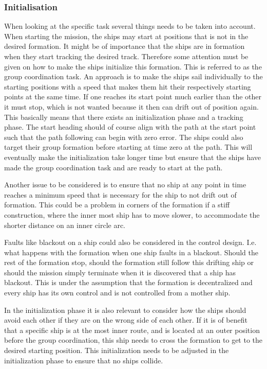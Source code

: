 \subsubsection{Initialisation}
When looking at the specific task several things needs to be taken into account. When starting the mission, the ships may start at positions that is not in the desired formation. It might be of importance that the ships are in
formation when they start tracking the desired track. Therefore some
attention must be given on how to make the ships initialize this
formation. This is referred to as the group coordination task. An approach is to make the ships sail individually to the
starting positions with a speed that makes them hit their respectively starting points at
the same time. If one reaches its start point much earlier
than the other it must stop, which is not wanted because it then can
drift out of position again. This basically means that there exists an initialization
phase and a tracking phase. The start heading should of
course align with the path at the start point such that the path following can begin with zero error. The ships could also target their group formation before starting at time zero at the path. This will eventually make the initialization take longer time but ensure that the ships have made the group coordination task and are ready to start at the path.

Another issue to be considered is to ensure that no ship at
any point in time reaches a minimum speed that is necessary for the
ship to not drift out of formation. This could be a problem in corners
of the formation if a stiff construction, where the inner most ship
has to move slower, to accommodate the shorter distance on an inner
circle arc.

Faults like blackout on a ship could also be considered in the control
design. I.e. what happens with the formation when one ship faults in a
blackout. Should the rest of the formation stop, should the formation
still follow this drifting ship or should the mission simply terminate
when it is discovered that a ship has blackout. This is under the assumption that the formation is decentralized and every ship has its own control and is not controlled from a mother ship.

In the initialization phase it is also relevant to consider how the
ships should avoid each other if they are on the wrong side of each
other. If it is of benefit that a specific ship is at the most inner route, and is located at an outer position before the group coordination, this ship needs to cross the formation to get to the desired starting position. This initialization needs to be adjusted in the initialization phase to ensure that no ships collide.


